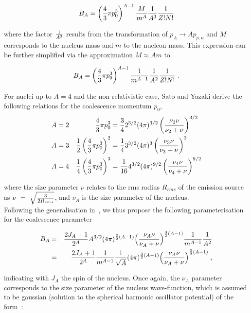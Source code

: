 \documentclass[a4paper,11pt]{scrartcl} %
\begin{document}
\begin{appendix}
\begin{equation}
B_{A} = \left({4 \over 3} \pi p_{0}^{3}\right)^{A-1} {M \over m^{A}} {1 \over A^{3}}{\frac{1}{Z! N!}}
\end{equation}

\noindent where the factor ${1 \over A^{3}}$ results from the transformation of $p_{A} \rightarrow A p_{p,n}$ and $M$ corresponds to the nucleus mass and $m$ to the nucleon mass. This expression can be further simplified via the approximation $M \approx A m$ to

\begin{equation}
B_{A} = \left({4 \over 3} \pi p_{0}^{3}\right)^{A-1} {1 \over m^{A-1}} {1 \over A^{2}}{\frac{1}{Z! N!}} \; .
\end{equation}

\noindent For nuclei up to $A = 4$ and the non-relativistic case, Sato and Yazaki derive the following relations for the coalescence momentum $p_{0}$, 
%
\begin{align}
	A& =2&
	{4 \over 3} \pi p_{0}^{3}& ={3 \over 4}2^{3/2}(4\pi)^{3/2} \left(\frac{\nu_{2}\nu}{\nu_{2} + \nu}\right)^{3/2}\\
	A& =3&
	{1 \over 2} \left( {4 \over 3} \pi p_{0}^{3}\right)^{2}& ={1 \over 4} 3^{3/2} (4\pi)^{3} \left(\frac{\nu_{3}\nu}{\nu_{3} + \nu}\right)^{3}\\
	A& =4&  
	{1 \over 4} \left({4 \over 3} \pi p_{0}^{3}\right)^{3}& = {1 \over 16} 4^{3/2} (4\pi)^{9/2} \left(\frac{\nu_{4}\nu}{\nu_{4}+ \nu}\right)^{9/2}
\end{align}

\noindent where the size parameter $\nu$ relates to the rms radius $R_{rms}$ of the emission source as $\nu~=~\sqrt{3 \over 2 R_{rms}}$, and $\nu_{A}$ is the size parameter of the nucleus. 
\\Following the generalisation in~\cite{Nagle:1996vp}, we thus propose the following parameterisation for the coalescence parameter

\begin{eqnarray}
B_{A} &=& {2J_{A} + 1 \over 2^{A}} A^{3/2} (4\pi)^{{3\over2}(A-1)} \Bigl({\nu_{A}\nu \over \nu_{A}+ \nu}\Bigr)^{{3\over2}(A-1)} {1 \over m^{A-1}} {1 \over A^{2}}  \\
\label{eq:SatoGeneralised}
           &=&  {2J_{A} + 1 \over 2^{A}} {1 \over m^{A-1}} {1 \over \sqrt{A}} (4\pi)^{{3\over2}(A-1)} \Bigl({\nu_{A}\nu \over \nu_{A}+ \nu}\Bigr)^{{3\over2}(A-1)} \;,
\end{eqnarray}

\noindent indicating with $J_{A}$ the spin of the nucleus.
Once again, the $\nu_{A}$ parameter corresponds to the size parameter of the nucleus wave-function, which is assumed to be gaussian (solution to the spherical harmonic oscillator potential) of the form~\cite{Sato:1981ez,Bergstrom:1979gpv}:


\end{appendix}
\end{document}
